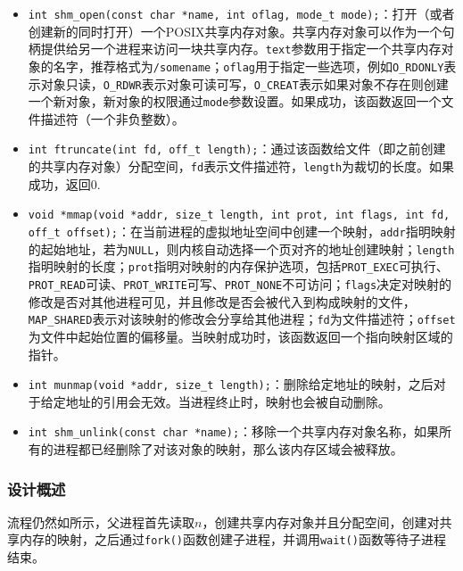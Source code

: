 \documentclass[lang=cn,11pt,a4paper,cite=authornum]{paper}
\begin{document}
\begin{itemize}
    \item \texttt{int shm_open(const char *name, int oflag, mode_t mode);}：打开（或者创建新的同时打开）一个POSIX共享内存对象。共享内存对象可以作为一个句柄提供给另一个进程来访问一块共享内存。\texttt{text}参数用于指定一个共享内存对象的名字，推荐格式为\texttt{/somename}；\texttt{oflag}用于指定一些选项，例如\texttt{O_RDONLY}表示对象只读，\texttt{O_RDWR}表示对象可读可写，\texttt{O_CREAT}表示如果对象不存在则创建一个新对象，新对象的权限通过\texttt{mode}参数设置。如果成功，该函数返回一个文件描述符（一个非负整数）。
    \item \texttt{int ftruncate(int fd, off_t length);}：通过该函数给文件（即之前创建的共享内存对象）分配空间，\texttt{fd}表示文件描述符，\texttt{length}为裁切的长度。如果成功，返回0.
    \item \texttt{void *mmap(void *addr, size_t length, int prot, int flags, int fd, off_t offset);}：在当前进程的虚拟地址空间中创建一个映射，\texttt{addr}指明映射的起始地址，若为\texttt{NULL}，则内核自动选择一个页对齐的地址创建映射；\texttt{length}指明映射的长度；\texttt{prot}指明对映射的内存保护选项，包括\texttt{PROT_EXEC}可执行、\texttt{PROT_READ}可读、\texttt{PROT_WRITE}可写、\texttt{PROT_NONE}不可访问；\texttt{flags}决定对映射的修改是否对其他进程可见，并且修改是否会被代入到构成映射的文件，\texttt{MAP_SHARED}表示对该映射的修改会分享给其他进程；\texttt{fd}为文件描述符；\texttt{offset}为文件中起始位置的偏移量。当映射成功时，该函数返回一个指向映射区域的指针。
    \item \texttt{int munmap(void *addr, size_t length);}：删除给定地址的映射，之后对于给定地址的引用会无效。当进程终止时，映射也会被自动删除。
    \item \texttt{int shm_unlink(const char *name);}：移除一个共享内存对象名称，如果所有的进程都已经删除了对该对象的映射，那么该内存区域会被释放。
\end{itemize}

\subsubsection{设计概述}

流程仍然如所示，父进程首先读取$n$，创建共享内存对象并且分配空间，创建对共享内存的映射，之后通过\texttt{fork()}函数创建子进程，并调用\texttt{wait()}函数等待子进程结束。
\end{document}
